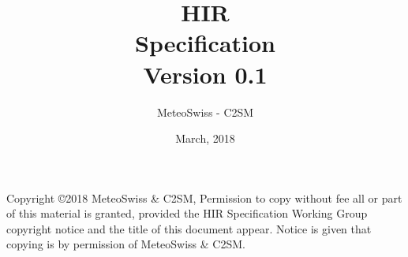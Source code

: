 \documentclass[a4paper,10pt,twoside]{article}
\title{{\Huge HIR}\\
Specification\\
\vspace{2cm}
Version 0.1\\ }
\author{
\Large MeteoSwiss - C2SM\\
}
\date{\vspace{4cm}\Large March, 2018}
\begin{document}
\maketitle

Copyright \copyright 2018 MeteoSwiss \& C2SM,
Permission to copy without fee all or part of this material is granted,
provided the HIR Specification Working Group copyright notice and the
title of this document appear. Notice is given that copying is by permission
of MeteoSwiss \& C2SM.

\clearpage
%
\cleardoublepage

\tableofcontents
\listoffigures
\listoftables

%

\newpage
\mbox{}\newpage

\pagestyle{fancy}
\fancyhead{} %
\fancyhead[RE]{\leftmark}
\fancyhead[LO]{\rightmark}
\fancyhead[LE,RO]{\thepage}
\fancyfoot{} %
\renewcommand{\headrulewidth}{0pt}
\renewcommand{\footrulewidth}{0pt}








\cleardoublepage
\end{document}
